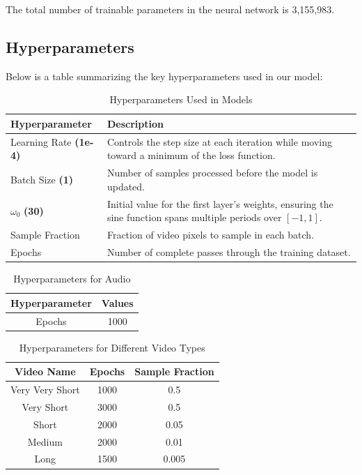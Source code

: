 \documentclass{ioereport}
\begin{document}
The total number of trainable parameters in the neural network is 3,155,983.

\subsection{Hyperparameters}
 Below is a table summarizing the key hyperparameters used in our model:

\begin{table}[H]
    \caption{Hyperparameters Used in Models}
    \centering
    \begin{tabular}{|L{3.1cm}|p{10cm}|}
    \hline
    \textbf{Hyperparameter} & \textbf{Description} \\
    \hline
    Learning Rate \textbf{(1e-4)} & Controls the step size at each iteration while moving toward a minimum of the loss function. \\
    \hline
    Batch Size \textbf{(1)} & Number of samples processed before the model is updated. \\
    \hline
    \( \omega_0 \) \textbf{(30)} & Initial value for the first layer's weights, ensuring the sine function spans multiple periods over \([-1, 1]\). \\
    \hline
    Sample Fraction & Fraction of video pixels to sample in each batch. \\
    \hline
    Epochs & Number of complete passes through the training dataset. \\
    \hline
    \end{tabular}
    \label{tab:hyperparameters-description}
\end{table}

\begin{table}[H]
    \caption{Hyperparameters for Audio}
    \centering
    \begin{tabular}{|c|c|}
    \hline
    \textbf{Hyperparameter} & \textbf{Values} \\
    \hline
    Epochs & 1000 \\
    \hline
    \end{tabular}
    \label{tab:hyperparameters-audio}
\end{table}



\begin{table}[H]
    \caption{Hyperparameters for Different Video Types}
    \centering
    \begin{tabular}{|c|c|c|}
    \hline
    \textbf{Video Name} & \textbf{Epochs} & \textbf{Sample Fraction} \\
    \hline
    Very Very Short & 1000 & 0.5 \\
    \hline
    Very Short & 3000 & 0.5 \\
    \hline
    Short & 2000 & 0.05 \\
    \hline
    Medium & 2000 & 0.01 \\
    \hline
    Long & 1500 & 0.005 \\
    \hline
    \end{tabular}
    \label{tab:hyperparameters-video}
\end{table}
\end{document}
